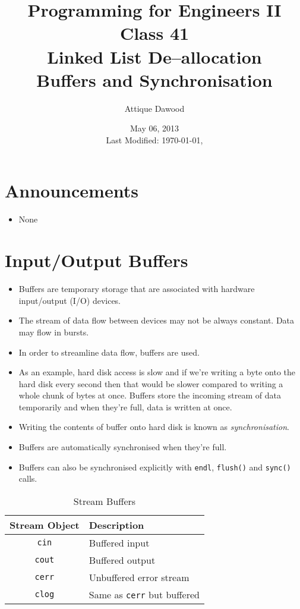 \documentclass[12pt,a4paper]{article}
\title{\vspace{-2cm}Programming for Engineers II\\Class 41\\Linked List De--allocation\\Buffers and Synchronisation}
\author{Attique Dawood}
\date{May 06, 2013\\[0.2cm] Last Modified: \today, \currenttime}
\begin{document}
\maketitle
\section{Announcements}
\begin{itemize}
\item None
\end{itemize}
\section{Input/Output Buffers}
\begin{itemize}
\item Buffers are temporary storage that are associated with hardware input/output (I/O) devices.
\item The stream of data flow between devices may not be always constant. Data may flow in bursts.
\item In order to streamline data flow, buffers are used.
\item As an example, hard disk access is slow and if we're writing a byte onto the hard disk every second then that would be slower compared to writing a whole chunk of bytes at once. Buffers store the incoming stream of data temporarily and when they're full, data is written at once.
\item Writing the contents of buffer onto hard disk is known as \textit{synchronisation}.
\item Buffers are automatically synchronised when they're full.
\item Buffers can also be synchronised explicitly with \verb|endl|, \verb|flush()| and \verb|sync()| calls.
\end{itemize}
\begin{table}[H]
\begin{center}
\vspace{0.3cm}
	\begin{tabular}{cl}
	\hline \hline
		\textbf{Stream Object} \rule{0pt}{2.6ex} & \textbf{Description}\\
		\hline
		\texttt{cin}\rule{0pt}{2.6ex} &  Buffered input\\
		\texttt{cout}\rule{0pt}{2.6ex} &  Buffered output\\
		\texttt{cerr}\rule{0pt}{2.6ex} &  Unbuffered error stream\\
		\texttt{clog}\rule{0pt}{2.6ex} &  Same as \verb|cerr| but buffered\\
	\hline \hline
	\end{tabular}
\end{center}
\label{StreamBuffers}
\caption{Stream Buffers}
\end{table}
\end{document}
